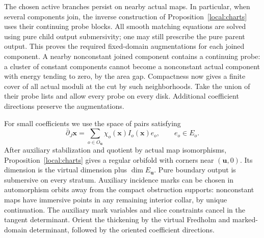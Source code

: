 \documentclass[11pt]{article}
\theoremstyle{definition}
\theoremstyle{remark}
\numberwithin{equation}{section}
\begin{document}
The chosen active branches persist on nearby actual maps.  In particular,
when several components join, the inverse construction of
Proposition~\ref{local:charts} uses their continuing probe blocks.  All smooth
matching equations are solved using pure child output submersivity;
one may still prescribe the pure parent output.  This proves the
required fixed-domain augmentations for each joined component.  A nearby
nonconstant joined component contains a continuing probe: a cluster of
constant components cannot become a nonconstant actual component with
energy tending to zero, by the area gap.  Compactness now gives a finite
cover of all actual moduli at the cut by such neighborhoods.  Take the
union of their probe lists and allow every probe on every disk.
Additional coefficient directions preserve the augmentations.

For small coefficients we use the space of pairs satisfying
\begin{equation}\label{virt:thickening}
 \bar\partial_J\mathbf x
   =\sum_{o\in O_{\mathbf u}}
        \chi_o(\mathbf x)I_o(\mathbf x)e_o,
 \qquad e_o\in E_o.
\end{equation}
After auxiliary stabilization and quotient by actual map isomorphisms,
Proposition~\ref{local:charts} gives a regular orbifold with corners near
$(\mathbf u,0)$.  Its dimension is the virtual dimension plus
$\dim E_{\mathbf u}$.  Pure boundary output is submersive on every
stratum.  Auxiliary incidence marks can be chosen in automorphism orbits
away from the compact obstruction supports: nonconstant maps have
immersive points in any remaining interior collar, by unique
continuation.  The auxiliary mark variables and slice constraints cancel
in the tangent determinant.  Orient the thickening by the virtual
Fredholm and marked-domain determinant, followed by the oriented
coefficient directions.
\end{document}
